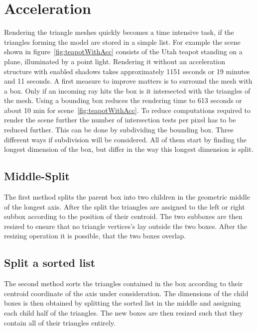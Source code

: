 \section{Acceleration}
Rendering the triangle meshes quickly becomes a time intensive task, if the triangles forming the model are stored in a simple list. For example the scene shown in figure~\ref{fig:teapotWithAcc} consists of the Utah teapot standing on a plane, illuminated by a point light. Rendering it without an acceleration structure with enabled shadows takes approximately 1151 seconds or 19 minutes and 11 seconds. A first measure to improve matters is to surround the mesh with a box. Only if an incoming ray hits the box is it intersected with the triangles of the mesh. Using a bounding box reduces the rendering time to 613 seconds or about 10 min for scene~\ref{fig:teapotWithAcc}. To reduce computations required to render the scene further the number of intersection tests per pixel has to be reduced further. This can be done by subdividing the bounding box. Three different ways if subdivision will be considered. All of them start by finding the longest dimension of the box, but differ in the way this longest dimension is split.
\subsection{Middle-Split}
The first method splits the parent box into two children in the geometric middle of the longest axis. After the split the triangles are assigned to the
left or right subbox according to the position of their centroid. The two subboxes are then resized to ensure that no triangle vertices's lay outside the two boxes. After the resizing operation it is possible, that the two boxes overlap.   
\subsection{Split a sorted list}
The second method sorts the triangles contained in the box according to their centroid coordinate of the axis under consideration. The dimensions of the child boxes is then obtained by splitting the sorted list in the middle and assigning each child half of the triangles. The new boxes are then resized such that they contain all of their triangles entirely.
